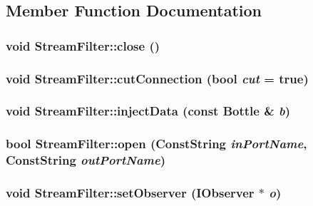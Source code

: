 \subsection{Member Function Documentation}
\hypertarget{classyarp_1_1os_1_1_stream_filter_a833b30281a0c6039cdfcded6986fe36e}{
\subsubsection[{close}]{\setlength{\rightskip}{0pt plus 5cm}void StreamFilter::close ()}}
\label{classyarp_1_1os_1_1_stream_filter_a833b30281a0c6039cdfcded6986fe36e}
\hypertarget{classyarp_1_1os_1_1_stream_filter_a3c72e672f88e6f9e8d77f7af8bcd31ee}{
\subsubsection[{cutConnection}]{\setlength{\rightskip}{0pt plus 5cm}void StreamFilter::cutConnection (bool {\em cut} = {\ttfamily true})}}
\label{classyarp_1_1os_1_1_stream_filter_a3c72e672f88e6f9e8d77f7af8bcd31ee}
\hypertarget{classyarp_1_1os_1_1_stream_filter_a0dad0b2389fa998afc9336509569a01f}{
\subsubsection[{injectData}]{\setlength{\rightskip}{0pt plus 5cm}void StreamFilter::injectData (const Bottle \& {\em b})}}
\label{classyarp_1_1os_1_1_stream_filter_a0dad0b2389fa998afc9336509569a01f}
\hypertarget{classyarp_1_1os_1_1_stream_filter_aa2203de7321cabb2eb8e8a28b66cc470}{
\subsubsection[{open}]{\setlength{\rightskip}{0pt plus 5cm}bool StreamFilter::open (ConstString {\em inPortName}, \/  ConstString {\em outPortName})}}
\label{classyarp_1_1os_1_1_stream_filter_aa2203de7321cabb2eb8e8a28b66cc470}
\hypertarget{classyarp_1_1os_1_1_stream_filter_a6f911f0b7818d212d58f05fe82c096a1}{
\subsubsection[{setObserver}]{\setlength{\rightskip}{0pt plus 5cm}void StreamFilter::setObserver ({\bf IObserver} $\ast$ {\em o})}}
\label{classyarp_1_1os_1_1_stream_filter_a6f911f0b7818d212d58f05fe82c096a1}


